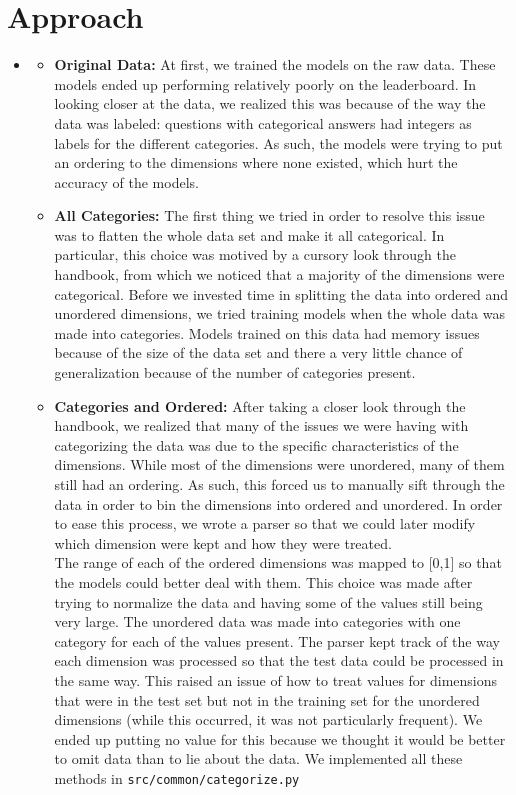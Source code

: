 \section{Approach}
\medskip
\begin{itemize}

    \item {}
    \begin{itemize}
    \item \textbf{Original Data:} At first, we trained the models on the raw data. These models ended up performing relatively poorly on the leaderboard. In looking closer at the data, we realized this was because of the way the data was labeled: questions with categorical answers had integers as labels for the different categories. As such, the models were trying to put an ordering to the dimensions where none existed, which hurt the accuracy of the models.

    \item \textbf{All Categories:} The first thing we tried in order to resolve this issue was to flatten the whole data set and make it all categorical. In particular, this choice was motived by a cursory look through the handbook, from which we noticed that a majority of the dimensions were categorical. Before we invested time in splitting the data into ordered and unordered dimensions, we tried training models when the whole data was made into categories. Models trained on this data had memory issues because of the size of the data set and there a very little chance of generalization because of the number of categories present.

    \item \textbf{Categories and Ordered:} After taking a closer look through the handbook, we realized that many of the issues we were having with categorizing the data was due to the specific characteristics of the dimensions. While most of the dimensions were unordered, many of them still had an ordering. As such, this forced us to manually sift through the data in order to bin the dimensions into ordered and unordered. In order to ease this process, we wrote a parser so that we could later modify which dimension were kept and how they were treated. \\
    
    The range of each of the ordered dimensions was mapped to [0,1] so that the models could better deal with them. This choice was made after trying to normalize the data and having some of the values still being very large. The unordered data was made into categories with one category for each of the values present. The parser kept track of the way each dimension was processed so that the test data could be processed in the same way. This raised an issue of how to treat values for dimensions that were in the test set but not in the training set for the unordered dimensions (while this occurred, it was not particularly frequent). We ended up putting no value for this because we thought it would be better to omit data than to lie about the data. We implemented all these methods in \texttt{src/common/categorize.py}\\
    

\end{itemize}
\end{itemize}
